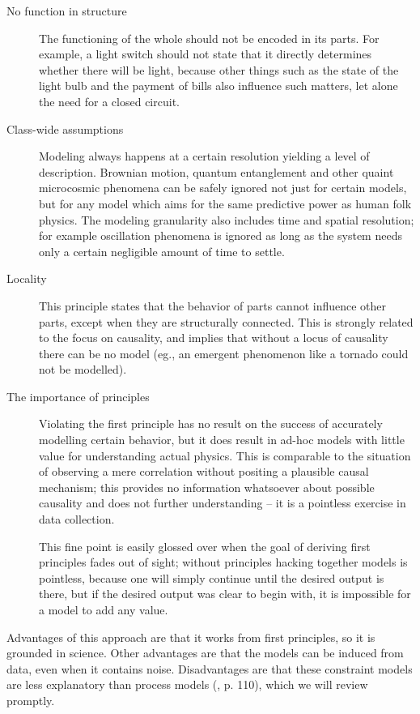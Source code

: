 \documentclass{article} %
\begin{document}
\begin{description}
	\item[No function in structure]
		The functioning of the whole should not be encoded in its
		parts. For example, a light switch should not state that it
		directly determines whether there will be light, because other
		things such as the state of the light bulb and the payment of
		bills also influence such matters, let alone the need for a
		closed circuit.

	\item[Class-wide assumptions]
		Modeling always happens at a certain resolution yielding a
		level of description. Brownian motion, quantum entanglement
		and other quaint microcosmic phenomena can be safely ignored
		not just for certain models, but for any model which aims for
		the same predictive power as human folk physics. The modeling
		granularity also includes time and spatial resolution; for
		example oscillation phenomena is ignored as long as the system
		needs only a certain negligible amount of time to settle.
	
	\item[Locality]
		This principle states that the behavior of parts cannot
		influence other parts, except when they are structurally
		connected. This is strongly related to the focus on causality,
		and implies that without a locus of causality there can be no
		model (eg., an emergent phenomenon like a tornado could not be
		modelled).

	\item[The importance of principles]
		Violating the first principle has no result on the success
		of accurately modelling certain behavior, but it does result in
		ad-hoc models with little value for understanding actual
		physics. This is comparable to the situation of observing a
		mere correlation without positing a plausible causal mechanism;
		this provides no information whatsoever about possible
		causality and does not further understanding -- it is a
		pointless exercise in data collection.

		This fine point is easily glossed over when the goal of
		deriving first principles fades out of sight; without
		principles hacking together models is pointless, because one
		will simply continue until the desired output is there, but if
		the desired output was clear to begin with, it is impossible
		for a model to add any value.
\end{description}

Advantages of this approach are that it works from first principles, so it is
grounded in science. Other advantages are that the models can be induced from
data, even when it contains noise. Disadvantages are that these constraint
models are less explanatory than process models (\cite{forbus}, p. 110), 
which we will review promptly.
\end{document}
